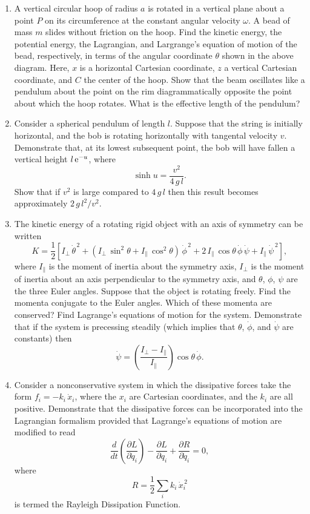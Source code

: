 {\begin{enumerate}
\epsfysize=1.75in
\centerline{}
\item A vertical circular hoop of radius $a$ is rotated in a vertical plane about a point $P$ on its
circumference at the constant angular velocity $\omega$. A bead of
mass $m$ slides without friction on the hoop. Find the kinetic energy, the potential energy, the Lagrangian, and Largrange's equation
of motion of the bead, respectively,  in terms of the angular coordinate $\theta$
shown in the above diagram. Here, $x$ is a horizontal Cartesian coordinate,
$z$ a vertical Cartesian coordinate, and $C$  the center of the hoop.
Show that the beam oscillates like a pendulum about the point on the
rim diagrammatically opposite the point about which the hoop
rotates. What is the effective length of the pendulum?

\item Consider a spherical pendulum of length $l$. Suppose that the string is initially horizontal, and the bob is rotating horizontally with tangental velocity $v$. Demonstrate that, at its lowest subsequent point, the bob will have fallen a vertical height $l\,{\rm e}^{-u}$,
where
$$
\sinh u = \frac{v^2}{4\,g\,l}.
$$
Show that if $v^2$ is large compared to $4\,g\,l$ then this result becomes approximately
$2\,g\,l^2/v^2$. 

\item The kinetic energy of a rotating rigid object with an axis of symmetry
can be written
$$
K = \frac{1}{2}\left[I_\perp\,\dot{\theta}^{\,2} + (I_\perp\,\sin^2\theta + I_\parallel\,\cos^2\theta)\,\dot{\phi}^{\,2} + 2\,I_\parallel\,\cos\theta\,\dot{\phi}\,\dot{\psi} + I_\parallel\,\dot{\psi}^{\,2}\right],
$$
where $I_\parallel$ is the  moment of inertia about the symmetry axis,
$I_\perp$ is the moment of inertia about an axis perpendicular to the symmetry axis, and $\theta$, $\phi$, $\psi$ are the three Euler angles.
Suppose that the object is rotating freely.
Find the momenta conjugate to the Euler angles. Which of these
momenta are conserved? Find Lagrange's equations of motion for the
system. Demonstrate that if the system is precessing steadily (which
implies that $\theta$, $\dot{\phi}$, and $\dot{\psi}$ are constants) then
$$
\dot{\psi} = \left(\frac{I_\perp-I_\parallel}{I_\parallel}\right)\cos\theta\,\dot{\phi}.
$$
\item Consider a nonconservative system in which the 
dissipative forces take the form $f_i = -k_i\,\dot{x}_i$, where the $x_i$
are Cartesian coordinates, and the $k_i$ are all positive. Demonstrate that
the dissipative forces can be incorporated into the Lagrangian formalism 
provided that Lagrange's equations of motion are modified to read
$$
\frac{d}{dt}\left(\frac{\partial L}{\partial \dot{q}_i}\right) - \frac{\partial L}{\partial q_i} + \frac{\partial R}{\partial \dot{q}_i}=0,
$$
where
$$
R = \frac{1}{2} \sum_i k_i\,\dot{x}_i^{\,2}
$$
is termed the Rayleigh Dissipation Function.
\end{enumerate}
}